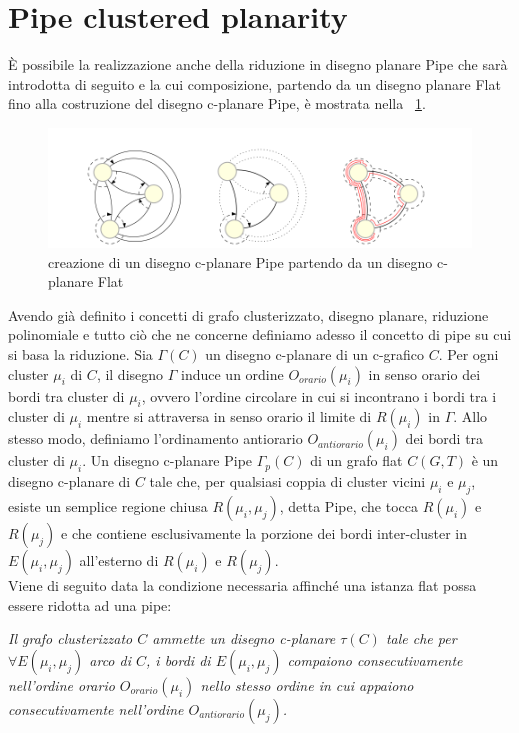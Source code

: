 {\section{Pipe clustered planarity}
È possibile la realizzazione anche della riduzione in disegno planare Pipe che sarà introdotta di seguito e la cui composizione, partendo da un disegno planare Flat fino alla costruzione del disegno c-planare Pipe, è mostrata nella  \figurename~\ref{fig:composizionePipe}.
\begin{figure}[!htb]
	\begin{center}
		\includegraphics[width=0.95 \linewidth]{figure/composizionePipe}
	\end{center}
	\caption{creazione di un disegno c-planare Pipe partendo da un disegno c-planare Flat \label{fig:composizionePipe}}
\end{figure}
\newline
Avendo già definito i concetti di grafo clusterizzato, disegno planare, riduzione polinomiale e tutto ciò che ne concerne definiamo adesso il concetto di pipe su cui si basa la riduzione.
Sia $\Gamma(C)$ un disegno c-planare di un c-grafico $C$. Per ogni cluster $\mu_i$ di $C$, il disegno $\Gamma$ induce un ordine $O_{orario}(\mu_i)$ in senso orario dei bordi tra cluster di $\mu_i$, ovvero l'ordine circolare in cui si incontrano i bordi tra i cluster di $\mu_i$ mentre si attraversa in senso orario il limite di $R(\mu_i)$ in $\Gamma$. Allo stesso modo, definiamo l'ordinamento antiorario $O_{antiorario}(\mu_i)$ dei bordi tra cluster di $\mu_i$. Un disegno c-planare Pipe $\Gamma_p(C)$ di un grafo flat $C(G, T)$ è un disegno c-planare di $C$ tale che, per qualsiasi coppia di cluster vicini $\mu_i$ e $\mu_j$, esiste un semplice regione chiusa $R(\mu_i, \mu_j)$, detta Pipe, che tocca $R(\mu_i)$ e $R(\mu_j)$ e che contiene esclusivamente la porzione dei bordi inter-cluster in $E(\mu_i, \mu_j)$ all'esterno di $R(\mu_i)$ e $R(\mu_j)$.\\
Viene di seguito data la condizione necessaria affinché una istanza flat possa essere ridotta ad una pipe:\\
\begin{center}
	\textit{Il grafo clusterizzato $C$ ammette un disegno c-planare $\tau(C)$ tale che per $\forall E(\mu_i,\mu_j)$ arco di $C$, i bordi di $E(\mu_i,\mu_j)$ compaiono consecutivamente nell'ordine orario $O_{orario}(\mu_i)$ nello stesso ordine in cui appaiono consecutivamente nell'ordine $O_{antiorario}(\mu_j)$.}\newline

\end{center}}

